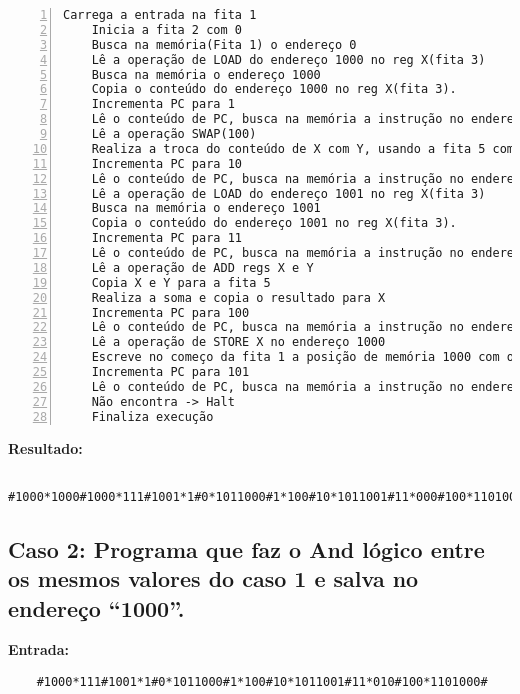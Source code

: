 \documentclass[a4paper,12pt]{article}
\begin{document}
\begin{Verbatim}[numbers=left,xleftmargin=1mm]
    Carrega a entrada na fita 1
    Inicia a fita 2 com 0
    Busca na memória(Fita 1) o endereço 0
    Lê a operação de LOAD do endereço 1000 no reg X(fita 3)
    Busca na memória o endereço 1000
    Copia o conteúdo do endereço 1000 no reg X(fita 3).
    Incrementa PC para 1
    Lê o conteúdo de PC, busca na memória a instrução no endereço 1
    Lê a operação SWAP(100)
    Realiza a troca do conteúdo de X com Y, usando a fita 5 como mediadora
    Incrementa PC para 10
    Lê o conteúdo de PC, busca na memória a instrução no endereço 10
    Lê a operação de LOAD do endereço 1001 no reg X(fita 3)
    Busca na memória o endereço 1001
    Copia o conteúdo do endereço 1001 no reg X(fita 3).
    Incrementa PC para 11
    Lê o conteúdo de PC, busca na memória a instrução no endereço 11
    Lê a operação de ADD regs X e Y
    Copia X e Y para a fita 5
    Realiza a soma e copia o resultado para X
    Incrementa PC para 100
    Lê o conteúdo de PC, busca na memória a instrução no endereço 100
    Lê a operação de STORE X no endereço 1000
    Escreve no começo da fita 1 a posição de memória 1000 com o valor 1000
    Incrementa PC para 101
    Lê o conteúdo de PC, busca na memória a instrução no endereço 101
    Não encontra -> Halt
    Finaliza execução
\end{Verbatim}

\textbf{Resultado:}
\begin{verbatim}
    #1000*1000#1000*111#1001*1#0*1011000#1*100#10*1011001#11*000#100*1101000#
\end{verbatim}

\newpage
\subsection*{Caso 2: Programa que faz o And lógico entre os mesmos valores do caso 1 e salva no endereço “1000”.}
\textbf{Entrada:}
\begin{verbatim}
    #1000*111#1001*1#0*1011000#1*100#10*1011001#11*010#100*1101000#
\end{verbatim}
\end{document}
